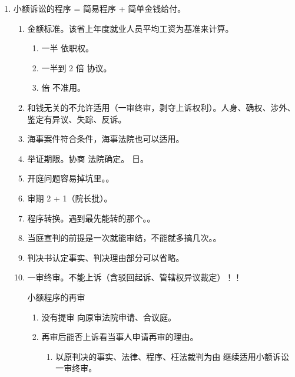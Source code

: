 \begin{enumerate}
\begin{enumerate}
                \begin{enumerate}
                  \item 普通转简易。开庭后不允许转为简易程序。
                  \item 简易转普通。用裁定、审期不重新计算。
                \end{enumerate}
        \end{enumerate}
  \item 小额诉讼的程序 = 简易程序 + 简单金钱给付。
        \begin{enumerate}
          \item 金额标准。该省上年度就业人员平均工资为基准来计算。
                \begin{enumerate}
                  \item \xyh 一半 \yjt 依职权。
                  \item 一半到 2 倍 \yjt 协议。
                  \item {} 倍 \yjt 不准用。
                \end{enumerate}
          \item 和钱无关的不允许适用（一审终审，剥夺上诉权利）。人身、确权、涉外、鉴定有异议、失踪、反诉。
          \item 海事案件符合条件，海事法院也可以适用。
          \item 举证期限。协商 \hz 法院确定。 日。
          \item 开庭问题容易掉坑里。。
          \item 审期 2 + 1（院长批）。
          \item 程序转换。遇到最先能转的那个。。
          \item 当庭宣判的前提是一次就能审结，不能就多搞几次。。
          \item 判决书认定事实、判决理由部分可以省略。
          \item 一审终审。不能上诉（含驳回起诉、管辖权异议裁定）！！
                \begin{kk}{小额程序的再审}
                  \begin{enumerate}
                    \item 没有提审 \yjt 向原审法院申请、合议庭。
                    \item 再审后能否上诉看当事人申请再审的理由。
                          \begin{enumerate}
                            \item 以原判决的事实、法律、程序、枉法裁判为由 \yjt 继续适用小额诉讼一审终审。

\end{enumerate}
\end{enumerate}
\end{kk}
\end{enumerate}
\end{enumerate}
